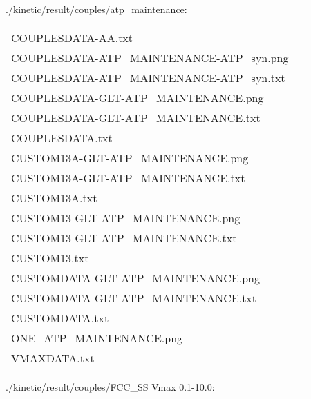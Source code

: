 \documentclass[a4paper, parskip=full]{scrreprt}
\begin{document}
./kinetic/result/couples/atp\_maintenance:

\begin{longtable}{ll}
COUPLESDATA-AA.txt\\
COUPLESDATA-ATP\_MAINTENANCE-ATP\_syn.png\\
COUPLESDATA-ATP\_MAINTENANCE-ATP\_syn.txt\\
COUPLESDATA-GLT-ATP\_MAINTENANCE.png\\
COUPLESDATA-GLT-ATP\_MAINTENANCE.txt\\
COUPLESDATA.txt\\
CUSTOM13A-GLT-ATP\_MAINTENANCE.png\\
CUSTOM13A-GLT-ATP\_MAINTENANCE.txt\\
CUSTOM13A.txt\\
CUSTOM13-GLT-ATP\_MAINTENANCE.png\\
CUSTOM13-GLT-ATP\_MAINTENANCE.txt\\
CUSTOM13.txt\\
CUSTOMDATA-GLT-ATP\_MAINTENANCE.png\\
CUSTOMDATA-GLT-ATP\_MAINTENANCE.txt\\
CUSTOMDATA.txt\\
ONE\_ATP\_MAINTENANCE.png\\
VMAXDATA.txt
\end{longtable}

./kinetic/result/couples/FCC\_SS Vmax 0.1-10.0:
\end{document}
